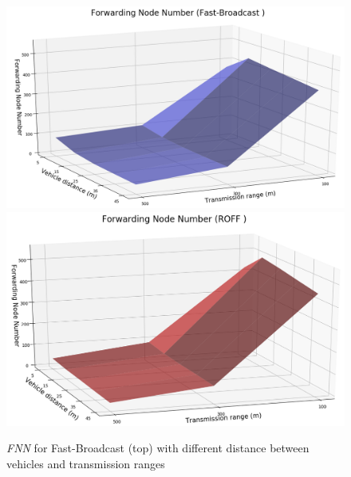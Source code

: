 		\begin{figure}[H]
			\centering
			\includegraphics[width=1.0\textwidth]{immagini/density/fb/fnn-1}
			\includegraphics[width=1.0\textwidth]{immagini/density/roff/fnn-1}
			\caption{\textit{FNN} for Fast-Broadcast (top) with different distance between vehicles and transmission ranges}
			\label{fig:density-fnn-1}
		\end{figure}
	
